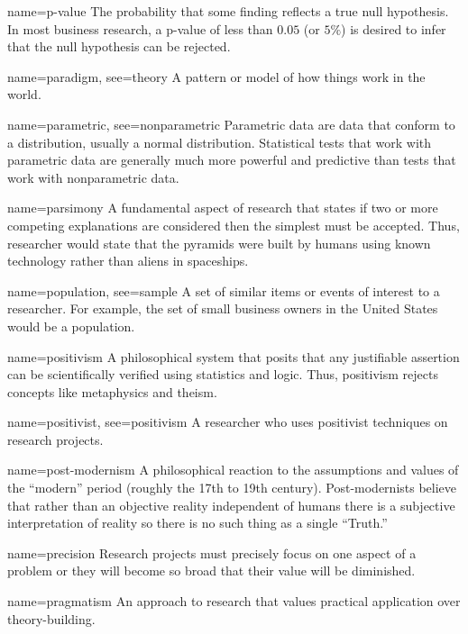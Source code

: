 {name={p-value}}
{%
	The probability that some finding reflects a true null hypothesis. In most business research, a p-value of less than $ 0.05 $ (or $ 5\% $) is desired to infer that the null hypothesis can be rejected.
}

{name={paradigm},
	see={theory}}
{%
	A pattern or model of how things work in the world. 
}

{name={parametric},
	see={nonparametric}}
{%
	Parametric data are data that conform to a distribution, usually a normal distribution. Statistical tests that work with parametric data are generally much more powerful and predictive than tests that work with nonparametric data.
}

	{name={parsimony}}
	{%
		A fundamental aspect of research that states if two or more competing explanations are considered then the simplest must be accepted. Thus, researcher would state that the pyramids were built by humans using known technology rather than aliens in spaceships.
	}

{name={population},
 see={sample}}
{%
	A set of similar items or events of interest to a researcher. For example, the set of small business owners in the United States would be a population.
}

{name={positivism}}
{%
	A philosophical system that posits that any justifiable assertion can be scientifically verified using statistics and logic. Thus, positivism rejects concepts like metaphysics and theism.
}

{name={positivist},
 see={positivism}}
{%
	A researcher who uses positivist techniques on research projects.
}

{name={post-modernism}}
{%
	A philosophical reaction to the assumptions and values of the ``modern'' period (roughly the 17th to 19th century). Post-modernists believe that rather than an objective reality independent of humans there is a subjective interpretation of reality so there is no such thing as a single ``Truth.''
}

{name={precision}}
{%
	Research projects must precisely focus on one aspect of a problem or they will become so broad that their value will be diminished.
}

{name={pragmatism}}
{%
	An approach to research that values practical application over theory-building. 
}

